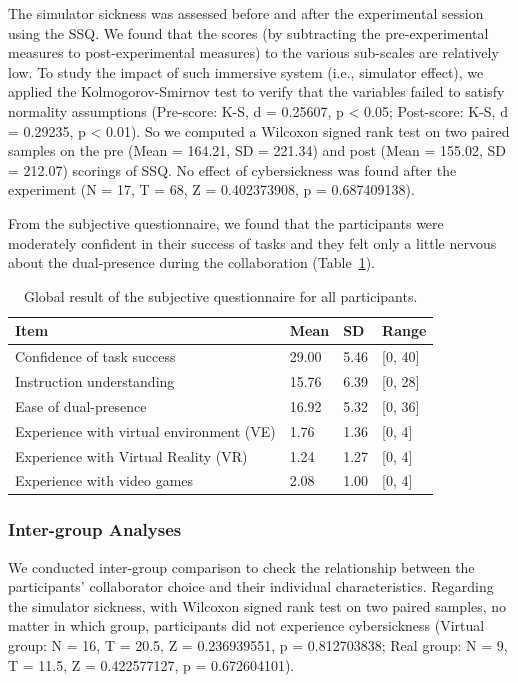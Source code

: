 The simulator sickness was assessed before and after the experimental session using the SSQ. We found that the scores (by subtracting the pre-experimental measures to post-experimental measures) to the various sub-scales are relatively low. To study the impact of such immersive system (i.e., simulator effect), we applied the Kolmogorov-Smirnov test to verify that the variables failed to satisfy normality assumptions (Pre-score: K-S, d = 0.25607, p \textless{} 0.05; Post-score: K-S, d = 0.29235, p \textless{} 0.01). So we computed a Wilcoxon signed rank test on two paired samples on the pre (Mean = 164.21, SD = 221.34) and post (Mean = 155.02, SD = 212.07) scorings of SSQ. No effect of cybersickness was found after the experiment (N = 17, T = 68, Z = 0.402373908, p = 0.687409138).

From the subjective questionnaire, we found that the participants were moderately confident in their success of tasks and they felt only a little nervous about the dual-presence during the collaboration (Table~\ref{tab:3_sub_qn}).

\begin{table}[hbt]
\renewcommand{\arraystretch}{1.3}
\caption{Global result of the subjective questionnaire for all participants.}
\label{tab:3_sub_qn}
\centering
\begin{tabular}{l l l l}
  \hline
  Item & Mean & SD & Range \\ \hline
  Confidence of task success & 29.00 & 5.46 & [0, 40] \\
  Instruction understanding & 15.76 & 6.39 & [0, 28] \\
  Ease of dual-presence & 16.92 & 5.32 & [0, 36] \\
  Experience with virtual environment (VE) & 1.76 & 1.36 & [0, 4] \\
  Experience with Virtual Reality (VR) & 1.24 & 1.27 & [0, 4] \\
  Experience with video games & 2.08 & 1.00 & [0, 4] \\ \hline
\end{tabular}
\end{table}


\subsubsection{Inter-group Analyses}
We conducted inter-group comparison to check the relationship between the participants' collaborator choice and their individual characteristics. Regarding the simulator sickness, with Wilcoxon signed rank test on two paired samples, no matter in which group, participants did not experience cybersickness (Virtual group: N = 16, T = 20.5, Z = 0.236939551, p = 0.812703838; Real group: N = 9, T = 11.5, Z = 0.422577127, p = 0.672604101).

